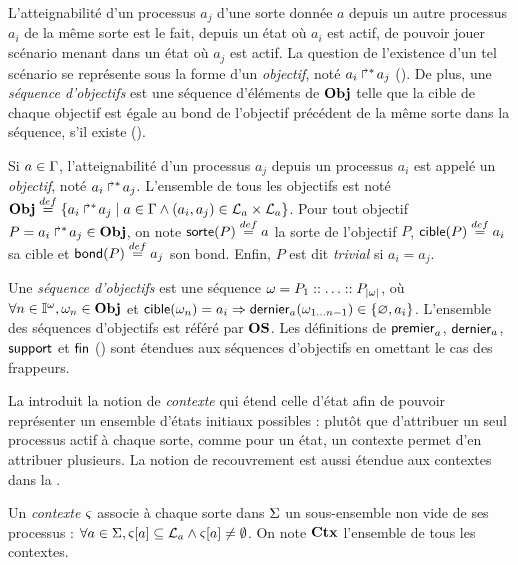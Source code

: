 L'atteignabilité d'un processus $a_j$ d'une sorte donnée $a$ depuis un autre processus $a_i$
de la même sorte est le fait, depuis un état où $a_i$ est actif,
de pouvoir jouer scénario menant dans un état où $a_j$ est actif.
La question de l'existence d'un tel scénario se représente sous la forme d'un \emph{objectif},
noté $\mbox{${a}_{i}\Rsh^*\!{a}_{j}$}$ ().
De plus, une \emph{séquence d'objectifs} est une séquence d'éléments de $\mathbf{Obj}$ telle que
la cible de chaque objectif est égale au bond de l'objectif précédent de la même sorte
dans la séquence, s'il existe ().

\begin{definition}
  Si $a \in \Gamma$, l'atteignabilité d'un processus $a_j$ depuis un processus $a_i$
  est appelé un \emph{objectif}, noté $\mbox{$a_i\Rsh^*\!a_j$}$.
  L'ensemble de tous les objectifs est noté
  $\mathbf{Obj} \stackrel{def}= \{ \mbox{$a_i\Rsh^*\!a_j$} \mid
    a \in \Gamma \wedge (a_i, a_j) \in \mathcal{L}_a \times \mathcal{L}_a \}$.
  Pour tout objectif $P = \mbox{$a_i\Rsh^*\!a_j$} \in \mathbf{Obj}$, on note
  $\mathsf{sorte}(P) \stackrel{def}= a$ la sorte de l'objectif $P$,
  $\mathsf{cible}(P) \stackrel{def}= a_i$ sa cible et $\mathsf{bond}(P) \stackrel{def}= a_j$ son bond.
  Enfin, $P$ est dit \emph{trivial} si $a_i = a_j$.
\end{definition}

\begin{definition}
  Une \emph{séquence d'objectifs} est une séquence $\omega = P_1 :: \ldots :: P_{|\omega|}$,
  où $\forall n \in \mathbb{I}^{\omega}, \omega_n \in \mathbf{Obj}$
  et $\mathsf{cible}(\omega_n) = a_i \Rightarrow \mathsf{dernier}_{a}(\omega_{1 \ldots n-1}) \in \{ \varnothing, a_i \}$.
  L'ensemble des séquences d'objectifs est référé par $\mathbf{OS}$.
  Les définitions de $\mathsf{premier}_a$, $\mathsf{dernier}_a$,  $\mathsf{support}$ et $\mathsf{fin}$
  () sont étendues aux séquences d'objectifs en omettant le cas des frappeurs.
\end{definition}

La  introduit la notion de \emph{contexte} qui étend celle d'état
afin de pouvoir représenter un ensemble d'états initiaux possibles :
plutôt que d'attribuer un seul processus actif à chaque sorte, comme pour un état,
un contexte permet d'en attribuer plusieurs.
La notion de recouvrement est aussi étendue aux contextes dans la .

\begin{definition}
  Un \emph{contexte} $\varsigma$ associe à chaque sorte dans $\Sigma$ un sous-ensemble non vide
  de ses processus :
  $\forall a \in \Sigma, {\varsigma[a]} \subseteq \mathcal{L}_a \wedge {\varsigma[a]} \neq \emptyset$.
  On note $\mathbf{Ctx}$ l'ensemble de tous les contextes.
\end{definition}

